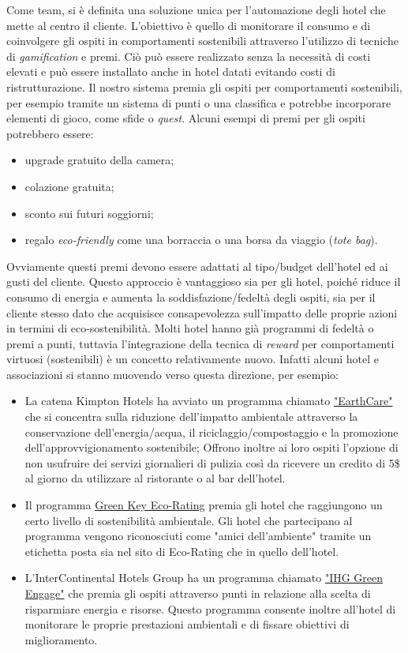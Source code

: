Come team, si è definita una soluzione unica per l'automazione degli hotel che mette al centro il cliente. L'obiettivo è quello di monitorare il consumo e di coinvolgere gli ospiti in comportamenti sostenibili attraverso l'utilizzo di tecniche di \textit{gamification} e premi. Ciò può essere realizzato senza la necessità di costi elevati e può essere installato anche in hotel datati evitando costi di ristrutturazione. Il nostro sistema premia gli ospiti per comportamenti sostenibili, per esempio tramite un sistema di punti o una classifica e potrebbe incorporare elementi di gioco, come sfide o \textit{quest}. Alcuni esempi di premi per gli ospiti potrebbero essere:
\begin{itemize}
    \item upgrade gratuito della camera;
    \item colazione gratuita;
    \item sconto sui futuri soggiorni;
    \item regalo \textit{eco-friendly} come una borraccia o una borsa da viaggio (\textit{tote bag}).
\end{itemize}
Ovviamente questi premi devono essere adattati al tipo/budget dell'hotel ed ai gusti del cliente. Questo approccio è vantaggioso sia per gli hotel, poiché riduce il consumo di energia e aumenta la soddisfazione/fedeltà degli ospiti, sia per il cliente stesso dato che acquisisce consapevolezza sull'impatto delle proprie azioni in termini di eco-sostenibilità.
%
Molti hotel hanno già programmi di fedeltà o premi a punti, tuttavia l'integrazione della tecnica di \textit{reward} per comportamenti virtuosi (sostenibili) è un concetto relativamente nuovo. Infatti alcuni hotel e associazioni si stanno muovendo verso questa direzione, per esempio:
\begin{itemize}
    \item La catena Kimpton Hotels ha avviato un programma chiamato \href{https://www.ihg.com/kimptonhotels/content/us/en/about-us/kimpton-cares/environment
    }{"EarthCare"}  che si concentra sulla riduzione dell'impatto ambientale attraverso la conservazione dell'energia/acqua, il riciclaggio/compostaggio e la promozione dell'approvvigionamento sostenibile; Offrono inoltre ai loro ospiti l'opzione di non usufruire dei servizi giornalieri di pulizia così da ricevere un credito di 5\$ al giorno da utilizzare al ristorante o al bar dell'hotel.
    \item Il programma \href{http://www.greenkeyglobal.com/home/green-key-eco-rating-2/
    }{Green Key Eco-Rating} premia gli hotel che raggiungono un certo livello di sostenibilità ambientale. Gli hotel che partecipano al programma vengono riconosciuti come "amici dell'ambiente" tramite un etichetta posta sia nel sito di Eco-Rating che in quello dell'hotel.
    \item L'InterContinental Hotels Group ha un programma chiamato \href{https://www.ihg.com/content/us/en/about/green-engage}{"IHG Green Engage"} che premia gli ospiti attraverso punti in relazione alla scelta di risparmiare energia e risorse. Questo programma consente inoltre all'hotel di monitorare le proprie prestazioni ambientali e di fissare obiettivi di miglioramento.
\end{itemize}
